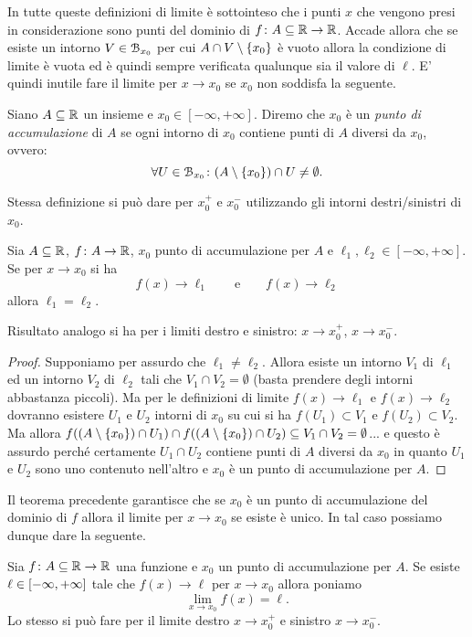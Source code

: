 In tutte queste definizioni di limite è sottointeso che i punti 
$x$ che vengono presi in considerazione sono punti 
del dominio di $f\colon A \subseteq {\mathbb R} \to {\mathbb R}$.
Accade allora che se esiste un intorno $V\in \mathcal B_{x_0}$
per cui $A \cap V \setminus {\left\{ x_0 \right\}}$ è vuoto allora 
la condizione di limite è vuota ed è quindi sempre verificata 
qualunque sia il valore di $\ell$. 
E' quindi inutile fare il limite per $x\to x_0$ 
se $x_0$ non soddisfa la seguente.

\begin{definition}
  \mymark{*}
  Siano $A\subseteq  {\mathbb R}$ un insieme e $x_0\in [-\infty, +\infty]$.
  Diremo che $x_0$ è un \emph{punto di accumulazione}%
%
 di $A$
  se ogni intorno di $x_0$ contiene punti di $A$ diversi da $x_0$, ovvero:
  \[
   \forall U \in \mathcal B_{x_0}\colon (A\setminus {\left\{ x_0 \right\}}) \cap U \neq \emptyset.
  \]

  Stessa definizione si può dare per $x_0^+$ e $x_0^-$ 
  utilizzando gli intorni destri/sinistri di $x_0$. 
\end{definition}

\begin{theorem}
\mymark{*}
Sia $A\subseteq {\mathbb R}$, $f\colon A \to {\mathbb R}$, $x_0$
punto di accumulazione per $A$ e $\ell_1, \ell_2\in [-\infty,+\infty]$.
Se per $x\to x_0$ si ha
\[
  f(x) \to \ell_1 \qquad\text{e}\qquad f(x) \to \ell_2
\]
allora $\ell_1=\ell_2$.

Risultato analogo si ha per i limiti destro e sinistro: $x\to x_0^+$, 
$x\to x_0^-$.
\end{theorem}
%
\begin{proof}
\mymark{*}
Supponiamo per assurdo che $\ell_1\neq \ell_2$.
Allora esiste un intorno $V_1$ di $\ell_1$ ed un intorno $V_2$ di $\ell_2$
tali che $V_1\cap V_2 = \emptyset$ (basta prendere degli intorni abbastanza piccoli). 
Ma per le definizioni di limite $f(x)\to \ell_1$ e $f(x)\to \ell_2$ 
dovranno esistere $U_1$ e $U_2$ intorni di $x_0$ su cui si ha 
$f(U_1)\subset V_1$ e $f(U_2)\subset V_2$. 
Ma allora $f((A\setminus{\left\{ x_0 \right\}})\cap U_1)\cap f((A\setminus{\left\{ x_0 \right\}})\cap U_2)\subseteq V_1\cap V_2 = \emptyset$... 
e questo è assurdo perché certamente $U_1\cap U_2$ 
contiene punti di $A$ diversi da $x_0$ in quanto 
$U_1$ e $U_2$ sono uno contenuto nell'altro e $x_0$ 
è un punto di accumulazione per $A$.
\end{proof}

Il teorema precedente garantisce che se $x_0$ è un punto di accumulazione 
del dominio di $f$ allora il limite per $x\to x_0$ se esiste è unico. 
In tal caso possiamo dunque dare la seguente.
%
\begin{definition}
Sia $f\colon A\subseteq {\mathbb R} \to {\mathbb R}$ una funzione e $x_0$ 
un punto di accumulazione per $A$. 
Se esiste $\ell\in\left[-\infty,+\infty\right]$ tale che
$f(x)\to \ell$ per $x\to x_0$ allora poniamo
\[
  \lim_{x\to x_0} f(x) = \ell.
\]
Lo stesso si può fare per il limite destro $x\to x_0^+$ 
e sinistro $x\to x_0^-$.
\end{definition}

